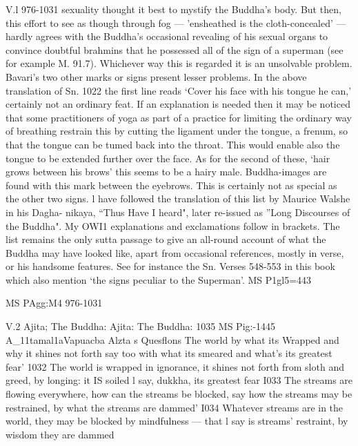    
   
   V.l 976-1031
   sexuality thought it best to mystify the Buddha's body. But then, this effort to
   see as though through fog — 'ensheathed is the cloth-concealed' — hardly agrees
   with the Buddha's occasional revealing of his sexual organs to convince doubtful
   brahmins that he possessed all of the sign of a superman (see for example M.
   91.7). Whichever way this is regarded it is an unsolvable problem.
   Bavari's two other marks or signs present lesser problems. In the above
   translation of Sn. 1022 the ﬁrst line reads `Cover his face with his tongue he
   can,' certainly not an ordinary feat. If an explanation is needed then it may be
   noticed that some practitioners of yoga as part of a practice for limiting the
   ordinary way of breathing restrain this by cutting the ligament under the tongue,
   a frenum, so that the tongue can be tumed back into the throat. This would
   enable also the tongue to be extended further over the face.
   As for the second of these, `hair grows between his brows' this seems to
   be a hairy male. Buddha-images are found with this mark between the eyebrows.
   This is certainly not as special as the other two signs.
   l have followed the translation of this list by Maurice Walshe in his Dagha-
   nikaya, “Thus Have I heard", later re-issued as ”Long Discourses of the Buddha".
   My OWI1 explanations and exclamations follow in brackets.
   The list remains the only sutta passage to give an all-round account of what
   the Buddha may have looked like, apart from occasional references, mostly in
   verse, or his handsome features. See for instance the Sn. Verses 548-553 in this
   book which also mention `the signs peculiar to the Superman'.
   MS P1gl5=443
   
   
   
   MS PAgg:M4
   976-1031
   
   
   
   V.2
   Ajita;
   The Buddha:
   Ajita:
   The Buddha:
   1035
   MS Pig:-1445
   A_11tamal1aVapuacba
   Alzta s Quesﬂons
   The world by what its Wrapped
   and why it shines not forth
   say too with what its smeared
   and what's its greatest fear' 1032
   The world is wrapped in ignorance,
   it shines not forth from sloth and greed,
   by longing: it IS soiled l say,
   dukkha, its greatest fear I033
   The streams are ﬂowing everywhere,
   how can the streams be blocked,
   say how the streams may be restrained,
   by what the streams are dammed' I034
   Whatever streams are in the world,
   they may be blocked by mindfulness —
   that l say is streams' restraint,
   by wisdom they are dammed
   
